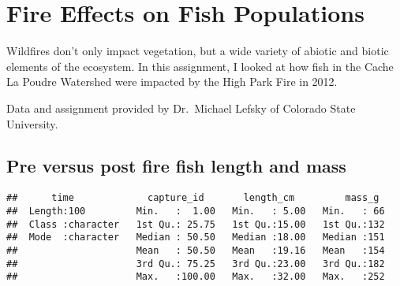 \documentclass[
]{book}
\newenvironment{Shaded}{\begin{snugshade}}{\end{snugshade}}
\newcommand{\CommentTok}[1]{\textcolor[rgb]{0.56,0.35,0.01}{\textit{#1}}}
\newcommand{\FunctionTok}[1]{\textcolor[rgb]{0.00,0.00,0.00}{#1}}
\newcommand{\NormalTok}[1]{#1}
\newcommand{\SpecialCharTok}[1]{\textcolor[rgb]{0.00,0.00,0.00}{#1}}
\newcommand{\StringTok}[1]{\textcolor[rgb]{0.31,0.60,0.02}{#1}}
\begin{document}
\hypertarget{fire-effects-on-fish-populations}{%
\chapter{Fire Effects on Fish Populations}\label{fire-effects-on-fish-populations}}

Wildfires don't only impact vegetation, but a wide variety of abiotic and biotic elements of the ecosystem. In this assignment, I looked at how fish in the Cache La Poudre Watershed were impacted by the High Park Fire in 2012.

Data and assignment provided by Dr.~Michael Lefsky of Colorado State University.

\hypertarget{pre-versus-post-fire-fish-length-and-mass}{%
\section{Pre versus post fire fish length and mass}\label{pre-versus-post-fire-fish-length-and-mass}}

\begin{Shaded}
\end{Shaded}

\begin{verbatim}
##      time             capture_id       length_cm         mass_g   
##  Length:100         Min.   :  1.00   Min.   : 5.00   Min.   : 66  
##  Class :character   1st Qu.: 25.75   1st Qu.:15.00   1st Qu.:132  
##  Mode  :character   Median : 50.50   Median :18.00   Median :151  
##                     Mean   : 50.50   Mean   :19.16   Mean   :154  
##                     3rd Qu.: 75.25   3rd Qu.:23.00   3rd Qu.:182  
##                     Max.   :100.00   Max.   :32.00   Max.   :252
\end{verbatim}

\begin{Shaded}
\end{Shaded}
\end{document}
